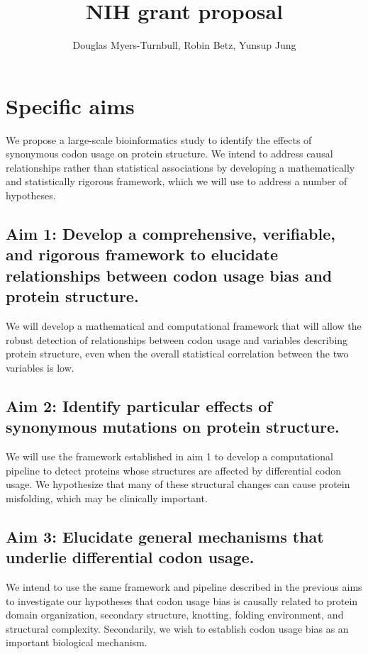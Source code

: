 \documentclass[11pt]{nih}
\title{\textbf{NIH grant proposal}}
\author{Douglas Myers-Turnbull, Robin Betz, Yunsup Jung}
\date{}
\begin{document}
\maketitle

\listoftodos

\tableofcontents


\section{Specific aims}


We propose a large-scale bioinformatics study to identify the effects of synonymous codon usage on protein structure. We intend to address causal relationships rather than statistical associations by developing a mathematically and statistically rigorous framework, which we will use to address a number of hypotheses. 

\subsection{Aim 1: Develop a comprehensive, verifiable, and rigorous framework to elucidate relationships between codon usage bias and protein structure.}
We will develop a mathematical and computational framework that will allow the robust detection of relationships between codon usage and variables describing protein structure, even when the overall statistical correlation between the two variables is low.

\subsection{Aim 2: Identify particular effects of synonymous mutations on protein structure.}
We will use the framework established in aim 1 to develop a computational pipeline to detect proteins whose structures are affected by differential codon usage. We hypothesize that many of these structural changes can cause protein misfolding, which may be clinically important.

\subsection{Aim 3: Elucidate general mechanisms that underlie differential codon usage.}
We intend to use the same framework and pipeline described in the previous aims to investigate our hypotheses that codon usage bias is causally related to protein domain organization, secondary structure, knotting, folding environment, and structural complexity. Secondarily, we wish to establish codon usage bias as an important biological mechanism.
\end{document}
